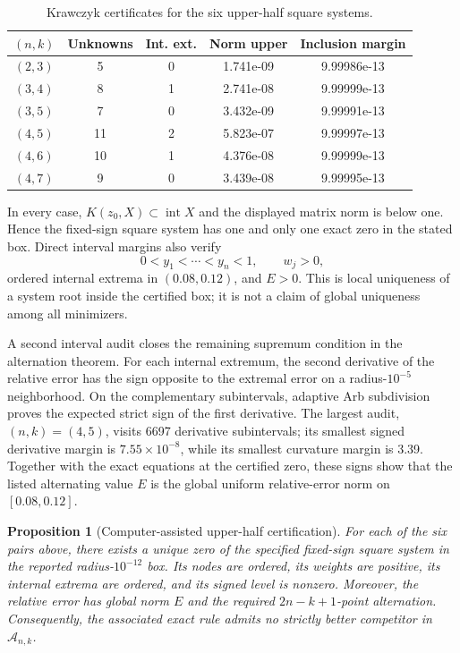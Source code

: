 \documentclass[preprint,12pt]{elsarticle}
\newtheorem{proposition}[theorem]{Proposition}
\theoremstyle{remark}
\begin{document}
\begin{table}[ht]
\centering
\caption{Krawczyk certificates for the six upper-half square systems.}
\label{tab:krawczyk}
\scriptsize
\begin{tabular}{ccccc}
\toprule
\((n,k)\) & Unknowns & Int. ext. & Norm upper & Inclusion margin\\
\midrule
\((2,3)\) & 5  & 0 & 1.741e-09 & 9.99986e-13\\
\((3,4)\) & 8  & 1 & 2.741e-08 & 9.99999e-13\\
\((3,5)\) & 7  & 0 & 3.432e-09 & 9.99991e-13\\
\((4,5)\) & 11 & 2 & 5.823e-07 & 9.99997e-13\\
\((4,6)\) & 10 & 1 & 4.376e-08 & 9.99999e-13\\
\((4,7)\) & 9  & 0 & 3.439e-08 & 9.99995e-13\\
\bottomrule
\end{tabular}
\end{table}

In every case, \(K(z_0,X)\subset\operatorname{int}X\) and the displayed
matrix norm is below one. Hence the fixed-sign square system has one
and only one exact zero in the stated box. Direct interval margins also
verify
\[
0<y_1<\cdots<y_n<1,\qquad w_j>0,
\]
ordered internal extrema in \((0.08,0.12)\), and \(E>0\). This is local
uniqueness of a system root inside the certified box; it is not a claim
of global uniqueness among all minimizers.

A second interval audit closes the remaining supremum condition in the
alternation theorem. For each internal extremum, the second derivative
of the relative error has the sign opposite to the extremal error on a
radius-\(10^{-5}\) neighborhood. On the complementary subintervals,
adaptive Arb subdivision proves the expected strict sign of the first
derivative. The largest audit, \((n,k)=(4,5)\), visits 6697 derivative
subintervals; its smallest signed derivative margin is
\(7.55\times10^{-8}\), while its smallest curvature margin is 3.39.
Together with the exact equations at the certified zero, these signs
show that the listed alternating value \(E\) is the global uniform
relative-error norm on \([0.08,0.12]\).

\begin{proposition}[Computer-assisted upper-half certification]
For each of the six pairs above, there exists a unique zero of the
specified fixed-sign square system in the reported radius-\(10^{-12}\)
box. Its nodes are ordered, its weights are positive, its internal
extrema are ordered, and its signed level is nonzero. Moreover, the
relative error has global norm \(E\) and the required
\(2n-k+1\)-point alternation. Consequently, the associated exact rule
admits no strictly better competitor in \(\mathcal A_{n,k}\).
\end{proposition}
\end{document}
